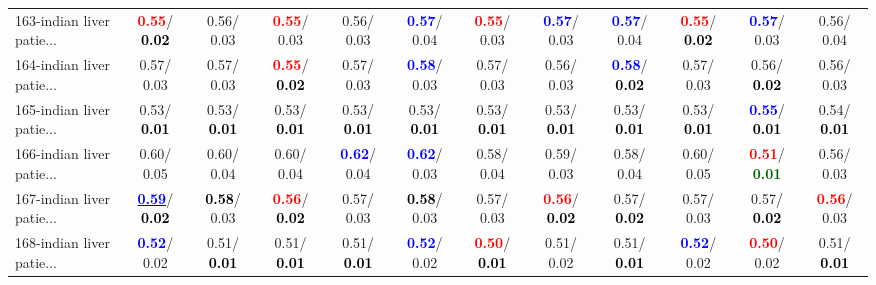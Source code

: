 \begin{table}[h]
\begin{center}
{\begin{tabular}{lc|c|c|c|c|c|c|c|c|c|c}
163-indian liver patie... & \textcolor{red}{\textbf{  0.55}}/\textcolor{black}{\textbf{  0.02}} &   0.56/  0.03 & \textcolor{red}{\textbf{  0.55}}/  0.03 &   0.56/  0.03 & \textcolor{blue}{\textbf{  0.57}}/  0.04 & \textcolor{red}{\textbf{  0.55}}/  0.03 & \textcolor{blue}{\textbf{  0.57}}/  0.03 & \textcolor{blue}{\textbf{  0.57}}/  0.04 & \textcolor{red}{\textbf{  0.55}}/\textcolor{black}{\textbf{  0.02}} & \textcolor{blue}{\textbf{  0.57}}/  0.03 &   0.56/  0.04 \\
164-indian liver patie... &   0.57/  0.03 &   0.57/  0.03 & \textcolor{red}{\textbf{  0.55}}/\textcolor{black}{\textbf{  0.02}} &   0.57/  0.03 & \textcolor{blue}{\textbf{  0.58}}/  0.03 &   0.57/  0.03 &   0.56/  0.03 & \textcolor{blue}{\textbf{  0.58}}/\textcolor{black}{\textbf{  0.02}} &   0.57/  0.03 &   0.56/\textcolor{black}{\textbf{  0.02}} &   0.56/  0.03 \\
165-indian liver patie... &   0.53/\textcolor{black}{\textbf{  0.01}} &   0.53/\textcolor{black}{\textbf{  0.01}} &   0.53/\textcolor{black}{\textbf{  0.01}} &   0.53/\textcolor{black}{\textbf{  0.01}} &   0.53/\textcolor{black}{\textbf{  0.01}} &   0.53/\textcolor{black}{\textbf{  0.01}} &   0.53/\textcolor{black}{\textbf{  0.01}} &   0.53/\textcolor{black}{\textbf{  0.01}} &   0.53/\textcolor{black}{\textbf{  0.01}} & \textcolor{blue}{\textbf{  0.55}}/\textcolor{black}{\textbf{  0.01}} &   0.54/\textcolor{black}{\textbf{  0.01}} \\
166-indian liver patie... &   0.60/  0.05 &   0.60/  0.04 &   0.60/  0.04 & \textcolor{blue}{\textbf{  0.62}}/  0.04 & \textcolor{blue}{\textbf{  0.62}}/  0.03 &   0.58/  0.04 &   0.59/  0.03 &   0.58/  0.04 &   0.60/  0.05 & \textcolor{red}{\textbf{  0.51}}/\textcolor{darkgreen}{\textbf{  0.01}} &   0.56/  0.03 \\
167-indian liver patie... & \underline{\textcolor{blue}{\textbf{  0.59}}}/\textcolor{black}{\textbf{  0.02}} & \textcolor{black}{\textbf{  0.58}}/  0.03 & \textcolor{red}{\textbf{  0.56}}/\textcolor{black}{\textbf{  0.02}} &   0.57/  0.03 & \textcolor{black}{\textbf{  0.58}}/  0.03 &   0.57/  0.03 & \textcolor{red}{\textbf{  0.56}}/\textcolor{black}{\textbf{  0.02}} &   0.57/\textcolor{black}{\textbf{  0.02}} &   0.57/  0.03 &   0.57/\textcolor{black}{\textbf{  0.02}} & \textcolor{red}{\textbf{  0.56}}/  0.03 \\ \hline
168-indian liver patie... & \textcolor{blue}{\textbf{  0.52}}/  0.02 &   0.51/\textcolor{black}{\textbf{  0.01}} &   0.51/\textcolor{black}{\textbf{  0.01}} &   0.51/\textcolor{black}{\textbf{  0.01}} & \textcolor{blue}{\textbf{  0.52}}/  0.02 & \textcolor{red}{\textbf{  0.50}}/\textcolor{black}{\textbf{  0.01}} &   0.51/  0.02 &   0.51/\textcolor{black}{\textbf{  0.01}} & \textcolor{blue}{\textbf{  0.52}}/  0.02 & \textcolor{red}{\textbf{  0.50}}/  0.02 &   0.51/\textcolor{black}{\textbf{  0.01}} \\

\end{tabular}}
\end{center}
\end{table}
